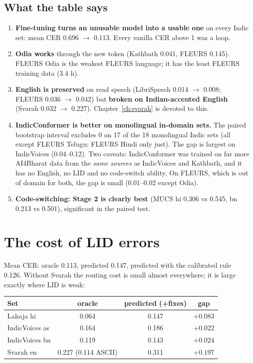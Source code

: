 \subsection*{What the table says}
\begin{enumerate}
\item \textbf{Fine-tuning turns an unusable model into a usable one} on every Indic set: mean CER 0.696 $\to$ 0.113. Every vanilla
CER above 1 was a loop.
\item \textbf{Odia works} through the new token (Kathbath 0.041, FLEURS 0.145). FLEURS Odia is the weakest FLEURS language; it has
the least FLEURS training data (3.4 h).
\item \textbf{English is preserved} on read speech (LibriSpeech 0.014 $\to$ 0.008; FLEURS 0.036 $\to$ 0.042) but \textbf{broken on
Indian-accented English} (Svarah 0.032 $\to$ 0.227). Chapter~\ref{ch:svarah} is devoted to this.
\item \textbf{IndicConformer is better on monolingual in-domain sets.} The paired bootstrap interval excludes 0 on 17 of the 18
monolingual Indic sets (all except FLEURS Telugu; FLEURS Hindi only just). The gap is largest on IndicVoices (0.04--0.12). Two caveats:
IndicConformer was trained on far more AI4Bharat data from the \emph{same sources} as IndicVoices and Kathbath, and it has no
English, no LID and no code-switch ability. On FLEURS, which is out of domain for both, the gap is small (0.01--0.02 except Odia).
\item \textbf{Code-switching: Stage 2 is clearly best} (MUCS hi 0.306 vs 0.545, bn 0.213 vs 0.501), significant in the paired test.
\end{enumerate}

\section{The cost of LID errors}

Mean CER: oracle 0.113, predicted 0.147, predicted with the calibrated rule 0.126. Without Svarah the routing cost is small almost
everywhere; it is large exactly where LID is weak:

\begin{center}
\begin{tabular}{lccc}
\toprule
Set & oracle & predicted (+fixes) & gap\\
\midrule
Lahaja hi & 0.064 & 0.147 & $+0.083$\\
IndicVoices as & 0.164 & 0.186 & $+0.022$\\
IndicVoices bn & 0.119 & 0.143 & $+0.024$\\
Svarah en & 0.227 (0.114 ASCII) & 0.311 & $+0.197$\\
\bottomrule
\end{tabular}
\end{center}

